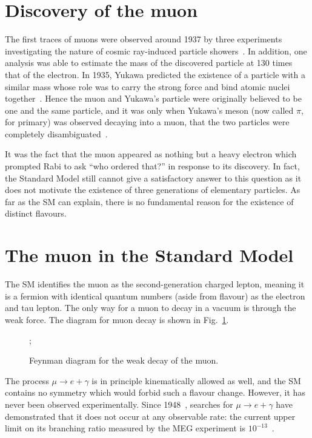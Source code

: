 \section{Discovery of the muon}
The first traces of muons were observed around 1937 by three experiments
investigating the nature of cosmic ray-induced particle
showers~\cite{PhysRev.51.884, PhysRev.52.1198, PhysRev.52.1003}. 
In addition, one analysis was able to estimate the mass of the discovered
particle at 130 times that of the electron. 
In 1935, Yukawa predicted the existence of a particle with a similar mass whose role
was to carry the strong force and bind atomic nuclei
together~\cite{10.1143/PTPS.1.1}. Hence the muon and Yukawa's particle were
originally believed to be one and the same particle, and it was only when
Yukawa's meson (now called $\pi$, for primary) was observed decaying into a muon,
that the two particles were completely disambiguated~\cite{LATTES1947}.

It was the fact that the muon appeared as nothing but a heavy electron which
prompted Rabi to ask ``who ordered that?'' in response to its discovery. In
fact, the Standard Model still cannot give a satisfactory answer to this
question as it does not motivate the existence of three generations of
elementary particles. As far as the SM can explain, there is no fundamental reason
for the existence of distinct flavours.

\section{The muon in the Standard Model}
% 
The SM identifies the muon as the second-generation charged lepton, meaning it
is a fermion with identical quantum numbers (aside from flavour) as the electron
and tau lepton. The only way for a muon to decay in a vacuum is through the weak
force. The diagram for muon decay is shown in Fig.~\ref{fig:weak_decay}.


\begin{figure}
    \centering
    ;
    \caption{Feynman diagram for the weak decay of the muon.}
    \label{fig:weak_decay}
\end{figure}

The process $\mu \rightarrow e + \gamma$ is in principle kinematically allowed
as well, and the SM contains no symmetry which would forbid such a flavour
change. However, it has never been observed experimentally. Since
1948~\cite{PhysRev.73.257}, searches for ${\mu \rightarrow e + \gamma}$ have
demonstrated that it does not occur at any observable rate: the current upper
limit on its branching ratio measured by the MEG experiment is
$10^{-13}$~\cite{mori2016final}.

